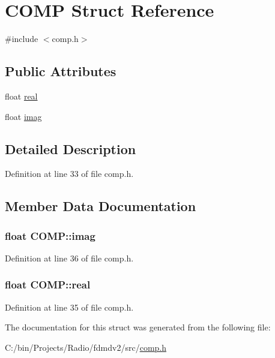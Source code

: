 \hypertarget{struct_c_o_m_p}{\section{C\-O\-M\-P Struct Reference}
\label{struct_c_o_m_p}
}


{\ttfamily \#include $<$comp.\-h$>$}

\subsection*{Public Attributes}
\begin{DoxyCompactItemize}
\item 
float \hyperlink{struct_c_o_m_p_aab5da66c35473e59242b301dafdfaf7e}{real}
\item 
float \hyperlink{struct_c_o_m_p_a8c292c732f8928c23921da6512699bba}{imag}
\end{DoxyCompactItemize}


\subsection{Detailed Description}


Definition at line 33 of file comp.\-h.



\subsection{Member Data Documentation}
\hypertarget{struct_c_o_m_p_a8c292c732f8928c23921da6512699bba}{
\subsubsection[{imag}]{\setlength{\rightskip}{0pt plus 5cm}float C\-O\-M\-P\-::imag}}\label{struct_c_o_m_p_a8c292c732f8928c23921da6512699bba}


Definition at line 36 of file comp.\-h.

\hypertarget{struct_c_o_m_p_aab5da66c35473e59242b301dafdfaf7e}{
\subsubsection[{real}]{\setlength{\rightskip}{0pt plus 5cm}float C\-O\-M\-P\-::real}}\label{struct_c_o_m_p_aab5da66c35473e59242b301dafdfaf7e}


Definition at line 35 of file comp.\-h.



The documentation for this struct was generated from the following file\-:\begin{DoxyCompactItemize}
\item 
C\-:/bin/\-Projects/\-Radio/fdmdv2/src/\hyperlink{comp_8h}{comp.\-h}\end{DoxyCompactItemize}
